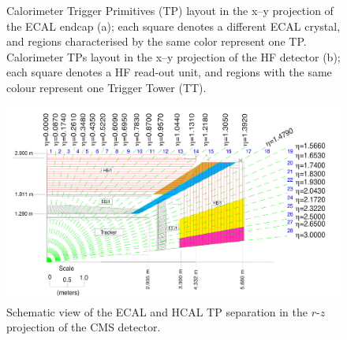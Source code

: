 \begin{figure}
    \centering
    \caption{Calorimeter Trigger Primitives (TP) layout in the x–y projection of the ECAL endcap (a); each square denotes a different ECAL crystal, and regions characterised by the same color represent one TP.
    Calorimeter TPs layout in the x–y projection of the HF detector (b); each square denotes a HF read-out unit, and regions with the same colour represent one Trigger Tower (TT).}
    \label{fig:EE_HF_L1TP}
\end{figure}

\begin{figure}
    \centering
    \includegraphics[width=0.9\linewidth]{Figures/L1TP/L1TP.pdf}
    \caption{Schematic view of the ECAL and HCAL TP separation in the $r$-$z$ projection of the CMS detector. }
    \label{fig:Layer1}
\end{figure}

